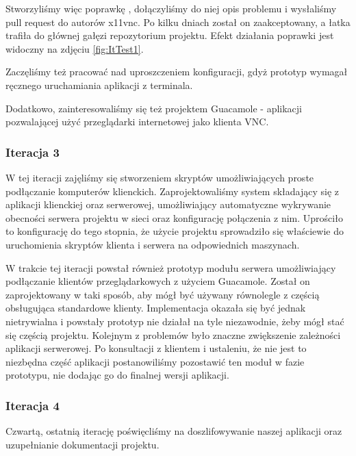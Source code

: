       Stworzyliśmy więc poprawkę \cite{x11vncPatch}, dołączyliśmy do niej opis problemu i wysłaliśmy pull request \cite{x11vncPullRequest} do autorów x11vnc. Po kilku dniach został on zaakceptowany, a łatka trafiła do głównej gałęzi repozytorium projektu. Efekt działania poprawki jest widoczny na zdjęciu \ref{fig:ItTest1}.


      Zaczęliśmy też pracować nad uproszczeniem konfiguracji, gdyż prototyp wymagał ręcznego uruchamiania aplikacji z terminala.

      Dodatkowo, zainteresowaliśmy się też projektem Guacamole \cite{Guacamole} - aplikacji pozwalającej użyć przeglądarki internetowej jako klienta VNC.

    \subsubsection{Iteracja 3}

      W tej iteracji zajęliśmy się stworzeniem skryptów umożliwiających proste podłączanie komputerów klienckich. Zaprojektowaliśmy system składający się z aplikacji klienckiej oraz serwerowej, umożliwiający automatyczne wykrywanie obecności serwera projektu w sieci oraz konfigurację połączenia z nim. Uprościło to konfigurację do tego stopnia, że użycie projektu sprowadziło się właściewie do uruchomienia skryptów klienta i serwera na odpowiednich maszynach.

    W trakcie tej iteracji powstał również prototyp modułu serwera umożliwiający podłączanie klientów przeglądarkowych z użyciem Guacamole. Został on zaprojektowany w taki sposób, aby mógł być używany równolegle z częścią obsługująca standardowe  klienty. Implementacja okazała się być jednak nietrywialna i powstały prototyp nie działał na tyle niezawodnie, żeby mógł stać się częścią projektu. Kolejnym z problemów było znaczne zwiększenie zależności aplikacji serwerowej. Po konsultacji z klientem i ustaleniu, że nie jest to niezbędna część aplikacji postanowiliśmy pozostawić ten moduł w fazie prototypu, nie dodając go do finalnej wersji aplikacji.

    \subsubsection{Iteracja 4}
      Czwartą, ostatnią iterację poświęcliśmy na doszlifowywanie naszej aplikacji oraz uzupełnianie dokumentacji projektu.

